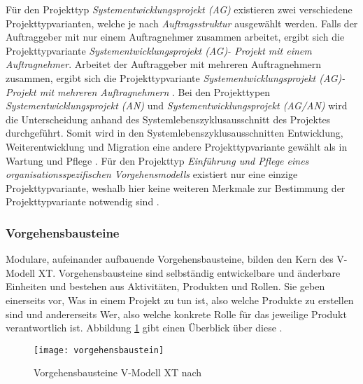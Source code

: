 Für den Projekttyp \textit{Systementwicklungsprojekt (AG)} existieren zwei verschiedene Projekttypvarianten, welche je nach \textit{Auftragsstruktur} ausgewählt werden. Falls der Auftraggeber mit nur einem Auftragnehmer zusammen arbeitet, ergibt sich die Projekttypvariante \textit{Systementwicklungsprojekt (AG)- Projekt mit einem Auftragnehmer}. Arbeitet der Auftraggeber mit mehreren Auftragnehmern zusammen, ergibt sich die Projekttypvariante \textit{Systementwicklungsprojekt (AG)- Projekt mit mehreren Auftragnehmern} \cite{2004vmodell}.\newline
Bei den Projekttypen \textit{Systementwicklungsprojekt (AN)} und \textit{Systementwicklungsprojekt (AG/AN)} wird die Unterscheidung anhand des Systemlebenszyklusausschnitt des Projektes durchgeführt. Somit wird in den Systemlebenszyklusausschnitten Entwicklung, Weiterentwicklung und Migration eine andere Projekttypvariante gewählt als in Wartung und Pflege \cite{2004vmodell}.\newline 
Für den Projekttyp \textit{Einführung und Pflege eines organisationsspezifischen Vorgehensmodells} existiert nur eine einzige Projekttypvariante, weshalb hier keine weiteren Merkmale zur Bestimmung der Projekttypvariante notwendig sind \cite{2004vmodell}.\newline

  
 \subsubsection{Vorgehensbausteine}
Modulare, aufeinander aufbauende Vorgehensbausteine, bilden den Kern des V-Modell XT. Vorgehensbausteine sind selbständig entwickelbare und änderbare Einheiten und bestehen aus Aktivitäten, Produkten und Rollen. Sie geben einerseits vor, \grqq Was\grqq{}  in einem Projekt zu tun ist, also welche Produkte zu erstellen sind und andererseits \grqq Wer\grqq, also welche konkrete Rolle für das jeweilige Produkt verantwortlich ist. Abbildung \ref{fig:vorgehensbausteine} gibt einen Überblick über diese \cite{ruf2008, 2004vmodell}.\newline

\begin{figure}[htp]
\begin{center}
  \texttt{[image: vorgehensbaustein]} %
  \caption{Vorgehensbausteine V-Modell XT nach \cite{2004vmodell}}
  \label{fig:vorgehensbausteine}
\end{center}
\end{figure}

